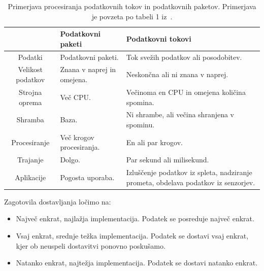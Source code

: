 \begin{table}[H]
    \centering
    \begin{tabularx}{\textwidth}{S L L}
                          & Podatkovni paketi          & Podatkovni tokovi                                                                  \\ \hline
        Podatki           & Podatkovni paketi.         & Tok svežih podatkov ali posodobitev.                                               \\
        Velikost podatkov & Znana v naprej in omejena. & Neskončna ali ni znana v naprej.                                                   \\
        Strojna oprema    & Več CPU.                   & Večinoma en CPU in omejena količina spomina.                                       \\
        Shramba           & Baza.                      & Ni shrambe, ali večina shranjena v spominu.                                        \\
        Procesiranje      & Več krogov procesiranja.   & En ali par krogov.                                                                 \\
        Trajanje          & Dolgo.                     & Par sekund ali milisekund.                                                         \\
        Aplikacije        & Pogosta uporaba.           & Izluščenje podatkov iz spleta, nadziranje prometa, obdelava podatkov iz senzorjev.
    \end{tabularx}

    \caption{Primerjava procesiranja podatkovnih tokov in podatkovnih paketov.
        Primerjava je povzeta po tabeli 1 iz~\cite{stream_analysis_systematic_literature_review}.}
    \label{tab:stream-batch}
\end{table}

Zagotovila dostavljanja ločimo na:
\begin{itemize}
    \item Največ enkrat, najlažja implementacija. Podatek se posreduje največ enkrat.
    \item Vsaj enkrat, srednje težka implementacija. Podatek se dostavi vsaj enkrat, kjer
          ob neuspeli dostavitvi ponovno poskušamo.
    \item Natanko enkrat, najtežja implementacija. Podatek se dostavi natanko enkrat.
\end{itemize}

